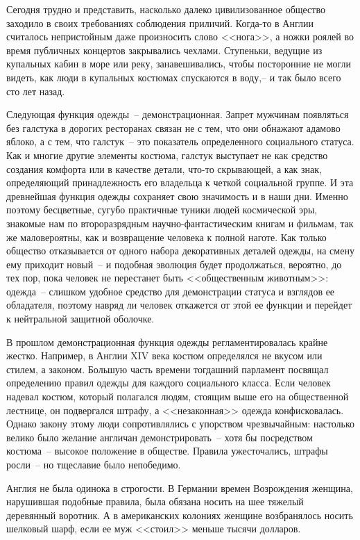   Сегодня трудно и представить, насколько далеко цивилизованное общество
  заходило в своих требованиях соблюдения приличий. Когда-то в Англии
  считалось непристойным даже произносить слово <<нога>>, а ножки роялей во
  время публичных концертов закрывались чехлами. Ступеньки, ведущие из
  купальных кабин в море или реку, занавешивались, чтобы посторонние не могли
  видеть, как люди в купальных костюмах спускаются в воду,-- и так было всего
  сто лет назад.
  
  Следующая функция одежды~-- демонстрационная. Запрет мужчинам появляться без
  галстука в дорогих ресторанах связан не с тем, что они обнажают адамово
  яблоко, а с тем, что галстук~-- это показатель определенного социального
  статуса. Как и многие другие элементы костюма, галстук выступает не как
  средство создания комфорта или в качестве детали, что-то скрывающей, а как
  знак, определяющий принадлежность его владельца к четкой социальной группе.
  И эта древнейшая функция одежды сохраняет свою значимость и в наши дни.
  Именно поэтому бесцветные, сугубо практичные туники людей космической эры,
  знакомые нам по второразрядным научно-фантастическим книгам и фильмам, так же
  маловероятны, как и возвращение человека к полной наготе. Как только общество
  отказывается от одного набора декоративных деталей одежды, на смену ему
  приходит новый~-- и подобная эволюция будет продолжаться, вероятно, до тех
  пор, пока человек не перестанет быть <<общественным животным>>: одежда~--
  слишком удобное средство для демонстрации статуса и взглядов ее обладателя,
  поэтому навряд ли человек откажется от этой ее функции и перейдет к
  нейтральной защитной оболочке.
  
  В прошлом демонстрационная функция одежды регламентировалась крайне жестко.
  Например, в Англии XIV века костюм определялся не вкусом или стилем, а
  законом. Большую часть времени тогдашний парламент посвящал определению
  правил одежды для каждого социального класса. Если человек надевал костюм,
  который полагался людям, стоящим выше его на общественной лестнице, он
  подвергался штрафу, а <<незаконная>> одежда конфисковалась. Однако закону
  этому люди сопротивлялись с упорством чрезвычайным: настолько велико было
  желание англичан демонстрировать~-- хотя бы посредством костюма~-- высокое
  положение в обществе. Правила ужесточались, штрафы росли~-- но тщеславие
  было непобедимо.
  
  Англия не была одинока в строгости. В Германии времен Возрождения женщина,
  нарушившая подобные правила, была обязана носить на шее тяжелый деревянный
  воротник. А в американских колониях женщине возбранялось носить шелковый
  шарф, если ее муж <<стоил>> меньше тысячи долларов.
  
